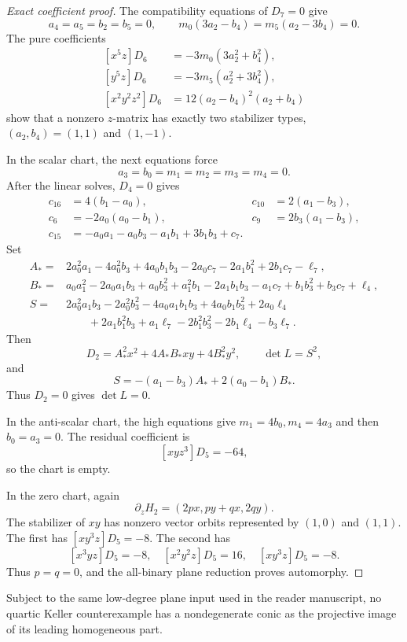 \begin{proof}[Exact coefficient proof]
The compatibility equations of \(D_7=0\) give
\[
 a_4=a_5=b_2=b_5=0,
 \qquad
 m_0(3a_2-b_4)=m_5(a_2-3b_4)=0.
\]
The pure coefficients
\[
\begin{aligned}
[x^5z]D_6&=-3m_0(3a_2^2+b_4^2),\\
[y^5z]D_6&=-3m_5(a_2^2+3b_4^2),\\
[x^2y^2z^2]D_6&=12(a_2-b_4)^2(a_2+b_4)
\end{aligned}
\]
show that a nonzero \(z\)-matrix has exactly two stabilizer types,
\((a_2,b_4)=(1,1)\) and \((1,-1)\).

In the scalar chart, the next equations force
\[
 a_3=b_0=m_1=m_2=m_3=m_4=0.
\]
After the linear solves, \(D_4=0\) gives
\[
\begin{aligned}
 c_{16}&=4(b_1-a_0),& c_{10}&=2(a_1-b_3),\\
 c_6&=-2a_0(a_0-b_1),&c_9&=2b_3(a_1-b_3),\\
 c_{15}&=-a_0a_1-a_0b_3-a_1b_1+3b_1b_3+c_7.
\end{aligned}
\]
Set
\begin{align*}
 A_*={}&2a_0^2a_1-4a_0^2b_3+4a_0b_1b_3-2a_0c_7
       -2a_1b_1^2+2b_1c_7-\ell_7,\\
 B_*={}&a_0a_1^2-2a_0a_1b_3+a_0b_3^2+a_1^2b_1
       -2a_1b_1b_3-a_1c_7+b_1b_3^2+b_3c_7+\ell_4,\\
 S={}&2a_0^2a_1b_3-2a_0^2b_3^2-4a_0a_1b_1b_3
       +4a_0b_1b_3^2+2a_0\ell_4\\
 &\qquad{}+2a_1b_1^2b_3+a_1\ell_7-2b_1^2b_3^2
       -2b_1\ell_4-b_3\ell_7.
\end{align*}
Then
\[
 D_2=A_*^2x^2+4A_*B_*xy+4B_*^2y^2,
 \qquad \det L=S^2,
\]
and
\[
 S=-(a_1-b_3)A_*+2(a_0-b_1)B_*.
\]
Thus \(D_2=0\) gives \(\det L=0\).

In the anti-scalar chart, the high equations give
\(m_1=4b_0,m_4=4a_3\) and then \(b_0=a_3=0\).  The residual coefficient is
\[
 [xyz^3]D_5=-64,
\]
so the chart is empty.

In the zero chart, again
\[
 \partial_zH_2=(2px,py+qx,2qy).
\]
The stabilizer of \(xy\) has nonzero vector orbits represented by
\((1,0)\) and \((1,1)\).  The first has
\([xy^3z]D_5=-8\).  The second has
\[
 [x^3yz]D_5=-8,
 \quad [x^2y^2z]D_5=16,
 \quad [xy^3z]D_5=-8.
\]
Thus \(p=q=0\), and the all-binary plane reduction proves automorphy.
\end{proof}

\begin{corollary}
\label{cor:quartic-all-conic-orbits}
Subject to the same low-degree plane input used in the reader manuscript,
no quartic Keller counterexample has a nondegenerate conic as the
projective image of its leading homogeneous part.
\end{corollary}

